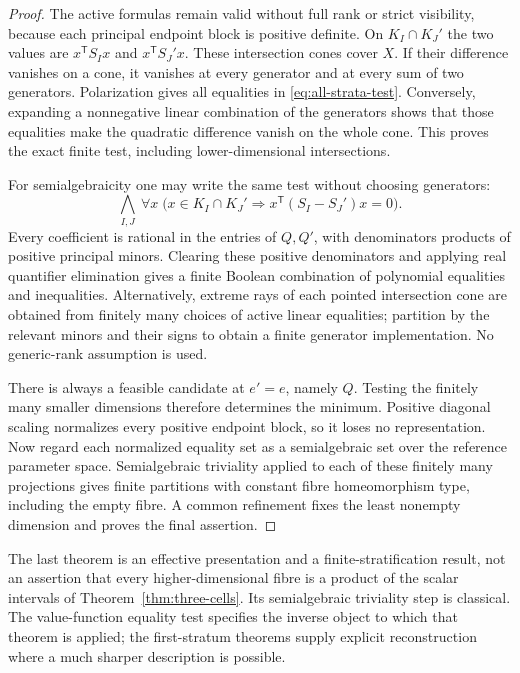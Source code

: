 \begin{proof}
The active formulas remain valid without full rank or strict visibility, because each principal endpoint block is positive definite. On $K_I\cap K_J'$ the two values are $x^{\mathsf T}S_Ix$ and $x^{\mathsf T}S_J'x$. These intersection cones cover $X$. If their difference vanishes on a cone, it vanishes at every generator and at every sum of two generators. Polarization gives all equalities in \eqref{eq:all-strata-test}. Conversely, expanding a nonnegative linear combination of the generators shows that those equalities make the quadratic difference vanish on the whole cone. This proves the exact finite test, including lower-dimensional intersections.

For semialgebraicity one may write the same test without choosing generators:
\[
 \bigwedge_{I,J}\ \forall x\;
 \bigl(x\in K_I\cap K_J'\Longrightarrow
 x^{\mathsf T}(S_I-S_J')x=0\bigr).
\]
Every coefficient is rational in the entries of $Q,Q'$, with denominators products of positive principal minors. Clearing these positive denominators and applying real quantifier elimination \cite{BCR} gives a finite Boolean combination of polynomial equalities and inequalities. Alternatively, extreme rays of each pointed intersection cone are obtained from finitely many choices of active linear equalities; partition by the relevant minors and their signs to obtain a finite generator implementation. No generic-rank assumption is used.

There is always a feasible candidate at $e'=e$, namely $Q$. Testing the finitely many smaller dimensions therefore determines the minimum. Positive diagonal scaling normalizes every positive endpoint block, so it loses no representation. Now regard each normalized equality set as a semialgebraic set over the reference parameter space. Semialgebraic triviality \cite{Hardt} applied to each of these finitely many projections gives finite partitions with constant fibre homeomorphism type, including the empty fibre. A common refinement fixes the least nonempty dimension and proves the final assertion.
\end{proof}

The last theorem is an effective presentation and a finite-stratification result, not an assertion that every higher-dimensional fibre is a product of the scalar intervals of Theorem~\ref{thm:three-cells}. Its semialgebraic triviality step is classical. The value-function equality test specifies the inverse object to which that theorem is applied; the first-stratum theorems supply explicit reconstruction where a much sharper description is possible.

